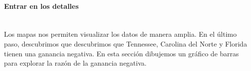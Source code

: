\documentclass[12pt,letterpaper]{article}
\begin{document}
    \paragraph{\Large Entrar en los detalles\\ \\}
    Los mapas nos permiten visualizar los datos de manera amplia. En el último paso, descubrimos que descubrimos que Tennessee, Carolina del Norte y Florida tienen una ganancia negativa. En esta sección dibujemos un gráfico de barras para explorar la razón de la ganancia negativa.
\end{document}
